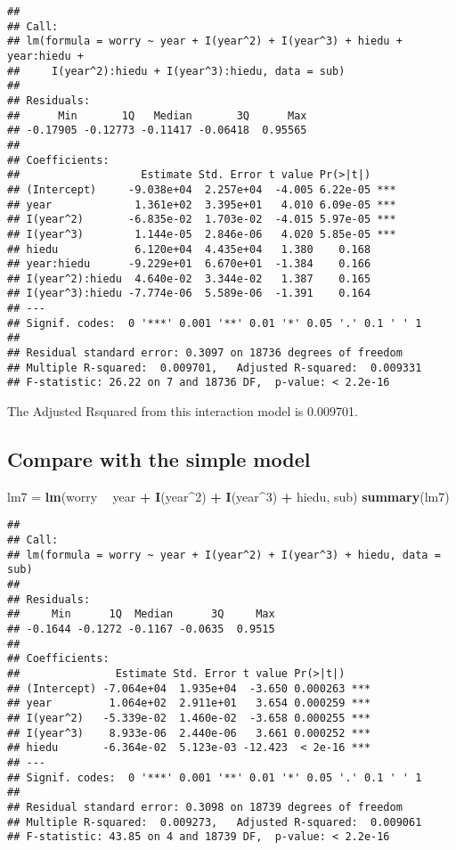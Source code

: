 \documentclass[]{article}
\newenvironment{Shaded}{\begin{snugshade}}{\end{snugshade}}
\newcommand{\DecValTok}[1]{\textcolor[rgb]{0.00,0.00,0.81}{#1}}
\newcommand{\KeywordTok}[1]{\textcolor[rgb]{0.13,0.29,0.53}{\textbf{#1}}}
\newcommand{\NormalTok}[1]{#1}
\newcommand{\OperatorTok}[1]{\textcolor[rgb]{0.81,0.36,0.00}{\textbf{#1}}}
\newcommand{\StringTok}[1]{\textcolor[rgb]{0.31,0.60,0.02}{#1}}
\begin{document}
\begin{verbatim}
## 
## Call:
## lm(formula = worry ~ year + I(year^2) + I(year^3) + hiedu + year:hiedu + 
##     I(year^2):hiedu + I(year^3):hiedu, data = sub)
## 
## Residuals:
##      Min       1Q   Median       3Q      Max 
## -0.17905 -0.12773 -0.11417 -0.06418  0.95565 
## 
## Coefficients:
##                   Estimate Std. Error t value Pr(>|t|)    
## (Intercept)     -9.038e+04  2.257e+04  -4.005 6.22e-05 ***
## year             1.361e+02  3.395e+01   4.010 6.09e-05 ***
## I(year^2)       -6.835e-02  1.703e-02  -4.015 5.97e-05 ***
## I(year^3)        1.144e-05  2.846e-06   4.020 5.85e-05 ***
## hiedu            6.120e+04  4.435e+04   1.380    0.168    
## year:hiedu      -9.229e+01  6.670e+01  -1.384    0.166    
## I(year^2):hiedu  4.640e-02  3.344e-02   1.387    0.165    
## I(year^3):hiedu -7.774e-06  5.589e-06  -1.391    0.164    
## ---
## Signif. codes:  0 '***' 0.001 '**' 0.01 '*' 0.05 '.' 0.1 ' ' 1
## 
## Residual standard error: 0.3097 on 18736 degrees of freedom
## Multiple R-squared:  0.009701,   Adjusted R-squared:  0.009331 
## F-statistic: 26.22 on 7 and 18736 DF,  p-value: < 2.2e-16
\end{verbatim}

The Adjusted Rsquared from this interaction model is 0.009701.

\hypertarget{compare-with-the-simple-model}{%
\subsection{Compare with the simple
model}\label{compare-with-the-simple-model}}

\begin{Shaded}
\begin{Highlighting}[]
\NormalTok{lm7 =}\StringTok{ }\KeywordTok{lm}\NormalTok{(worry }\OperatorTok{~}\StringTok{ }\NormalTok{year }\OperatorTok{+}\StringTok{ }\KeywordTok{I}\NormalTok{(year}\OperatorTok{^}\DecValTok{2}\NormalTok{) }\OperatorTok{+}\StringTok{ }\KeywordTok{I}\NormalTok{(year}\OperatorTok{^}\DecValTok{3}\NormalTok{) }\OperatorTok{+}\StringTok{ }\NormalTok{hiedu, sub)}
\KeywordTok{summary}\NormalTok{(lm7)}
\end{Highlighting}
\end{Shaded}

\begin{verbatim}
## 
## Call:
## lm(formula = worry ~ year + I(year^2) + I(year^3) + hiedu, data = sub)
## 
## Residuals:
##     Min      1Q  Median      3Q     Max 
## -0.1644 -0.1272 -0.1167 -0.0635  0.9515 
## 
## Coefficients:
##               Estimate Std. Error t value Pr(>|t|)    
## (Intercept) -7.064e+04  1.935e+04  -3.650 0.000263 ***
## year         1.064e+02  2.911e+01   3.654 0.000259 ***
## I(year^2)   -5.339e-02  1.460e-02  -3.658 0.000255 ***
## I(year^3)    8.933e-06  2.440e-06   3.661 0.000252 ***
## hiedu       -6.364e-02  5.123e-03 -12.423  < 2e-16 ***
## ---
## Signif. codes:  0 '***' 0.001 '**' 0.01 '*' 0.05 '.' 0.1 ' ' 1
## 
## Residual standard error: 0.3098 on 18739 degrees of freedom
## Multiple R-squared:  0.009273,   Adjusted R-squared:  0.009061 
## F-statistic: 43.85 on 4 and 18739 DF,  p-value: < 2.2e-16
\end{verbatim}
\end{document}
